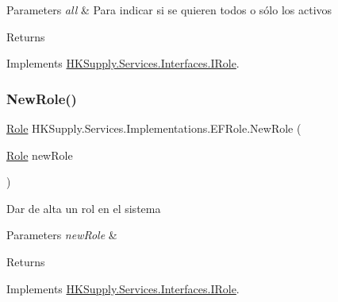 \begin{DoxyParams}{Parameters}
{\em all} & Para indicar si se quieren todos o sólo los activos\\
\hline
\end{DoxyParams}
\begin{DoxyReturn}{Returns}

\end{DoxyReturn}


Implements \hyperlink{interface_h_k_supply_1_1_services_1_1_interfaces_1_1_i_role}{H\+K\+Supply.\+Services.\+Interfaces.\+I\+Role}.

\mbox{\label{class_h_k_supply_1_1_services_1_1_implementations_1_1_e_f_role_a549317ad8c8fb3353382a8cd36fa1b22}} 
\subsubsection{\texorpdfstring{New\+Role()}{NewRole()}}
{\footnotesize\ttfamily \hyperlink{class_h_k_supply_1_1_models_1_1_role}{Role} H\+K\+Supply.\+Services.\+Implementations.\+E\+F\+Role.\+New\+Role (\begin{DoxyParamCaption}\item[{\hyperlink{class_h_k_supply_1_1_models_1_1_role}{Role}}]{new\+Role }\end{DoxyParamCaption})}



Dar de alta un rol en el sistema 


\begin{DoxyParams}{Parameters}
{\em new\+Role} & \\
\hline
\end{DoxyParams}
\begin{DoxyReturn}{Returns}

\end{DoxyReturn}


Implements \hyperlink{interface_h_k_supply_1_1_services_1_1_interfaces_1_1_i_role}{H\+K\+Supply.\+Services.\+Interfaces.\+I\+Role}.

\mbox{\label{class_h_k_supply_1_1_services_1_1_implementations_1_1_e_f_role_a2d880fce95c33f7581f2e3310ca943ed}} 
